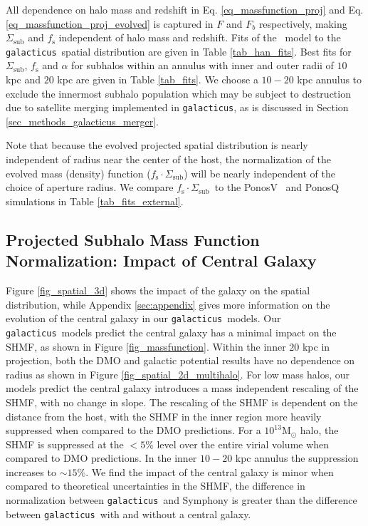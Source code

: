 \documentclass[%
 reprint,
 amsmath,
 amssymb,
 aps,
prd,
twocolumn,
superscriptaddress,
preprintnumbers,
floatfix,
nofootinbib
]{revtex4-2}
\def\gal{{\tt galacticus}~}
\def\galns{{\tt galacticus}}
\def\fssigsub{{$f_{\mathrm{s}} \cdot \Sigma_{\mathrm{sub}}$}}
\def\hanetal{\citet{10.1093/mnras/stv2900}~}
\newcommand{\reffig}[1]{Figure \ref{#1}}
\newcommand{\refsec}[1]{Section \ref{#1}}
\newcommand{\refappendix}[1]{Appendix \ref{#1}}
\newcommand{\reftable}[1]{Table \ref{#1}}
\newcommand{\refeq}[1]{Eq. \ref{#1}}
\begin{document}
%
All dependence on halo mass and redshift in \refeq{eq_massfunction_proj} and \refeq{eq_massfunction_proj_evolved} is captured in $F$ and $F_b$ respectively, making $\Sigma_{\mathrm{sub}}$ and $f_{\mathrm{s}}$ independent of halo mass and redshift.
Fits of the \hanetal model to the \gal spatial distribution are given in \reftable{tab_han_fits}.
Best fits for $\Sigma_{\mathrm{sub}}$, $f_{\mathrm{s}}$ and $\alpha$ for subhalos within an annulus with inner and outer radii of $10$ kpc and $20$ kpc are given in \reftable{tab_fits}.
We choose a $10-20$ kpc annulus to exclude the innermost subhalo population which may be subject to destruction due to satellite merging implemented in \galns, as is discussed in \refsec{sec_methods_galacticus_merger}.

Note that because the evolved projected spatial distribution is nearly independent of radius near the center of the host, the normalization of the evolved mass (density) function (\fssigsub) will be nearly independent of the choice of aperture radius.
We compare \fssigsub~to the PonosV~\citep{2016ApJ...824..144F} and PonosQ~\citep{2016ApJ...824..144F} simulations in \reftable{tab_fits_external}. 

\subsection{Projected Subhalo Mass Function Normalization: Impact of Central Galaxy}\label{sec_galaxy_norm}
\reffig{fig_spatial_3d} shows the impact of the galaxy on the spatial distribution, while \refappendix{sec:appendix} gives more information on the evolution of the central galaxy in our \gal models.
Our \gal models predict the central galaxy has a minimal impact on the SHMF, as shown in \reffig{fig_massfunction}. Within the inner $20$ kpc in projection, both the DMO and galactic potential results have no dependence on radius as shown in \reffig{fig_spatial_2d_multihalo}. For low mass halos, our models predict the central galaxy introduces a mass independent rescaling of the SHMF, with no change in slope. The rescaling of the SHMF is dependent on the distance from the host, with the SHMF in the inner region more heavily suppressed when compared to the DMO predictions.
For a $10^{13} \mathrm{M}_\odot$ halo, the SHMF is suppressed at the $ < 5\%$ level over the entire virial volume when compared to DMO predictions.
In the inner $10-20$ kpc annulus the suppression increases to $\sim 15\%$.
We find the impact of the central galaxy is minor when compared to theoretical uncertainties in the SHMF, the difference in normalization between \gal and Symphony is greater than the difference between \gal with and without a central galaxy.
\end{document}
